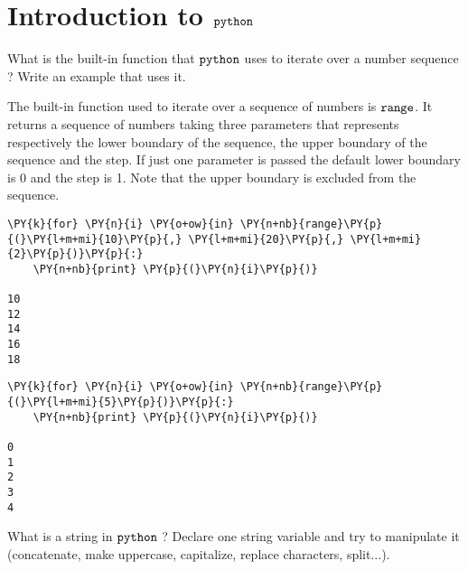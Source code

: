 \chapter{Introduction to $\tt{python}$}\label{introduction-to-python---lesson-1}

\begin{Exercise}[label={pippo}]
What is the built-in function that \(\tt{python}\) uses to iterate over a number sequence ? Write an example that uses it.
\end{Exercise}

\begin{Answer}
The built-in function used to iterate over a sequence of numbers is
\(\tt{range}\). It returns a sequence of numbers taking three parameters
that represents respectively the lower boundary of the sequence, the
upper boundary of the sequence and the step. If just one parameter is
passed the default lower boundary is 0 and the step is 1. Note that the
upper boundary is excluded from the sequence.

\begin{tcolorbox}[size=fbox, boxrule=1pt, colback=cellbackground, colframe=cellborder]
\begin{Verbatim}[commandchars=\\\{\}]
\PY{k}{for} \PY{n}{i} \PY{o+ow}{in} \PY{n+nb}{range}\PY{p}{(}\PY{l+m+mi}{10}\PY{p}{,} \PY{l+m+mi}{20}\PY{p}{,} \PY{l+m+mi}{2}\PY{p}{)}\PY{p}{:}
    \PY{n+nb}{print} \PY{p}{(}\PY{n}{i}\PY{p}{)}

10
12
14
16
18
\end{Verbatim}
\end{tcolorbox}

\begin{tcolorbox}[size=fbox, boxrule=1pt, colback=cellbackground, colframe=cellborder]
\begin{Verbatim}[commandchars=\\\{\}]
\PY{k}{for} \PY{n}{i} \PY{o+ow}{in} \PY{n+nb}{range}\PY{p}{(}\PY{l+m+mi}{5}\PY{p}{)}\PY{p}{:}
    \PY{n+nb}{print} \PY{p}{(}\PY{n}{i}\PY{p}{)}

0
1
2
3
4
\end{Verbatim}
\end{tcolorbox}
\end{Answer}

\begin{Exercise}{}
What is a string in \(\tt{python}\) ? Declare one string variable and try to manipulate it (concatenate, make uppercase, capitalize, replace characters, split...).
\end{Exercise}

